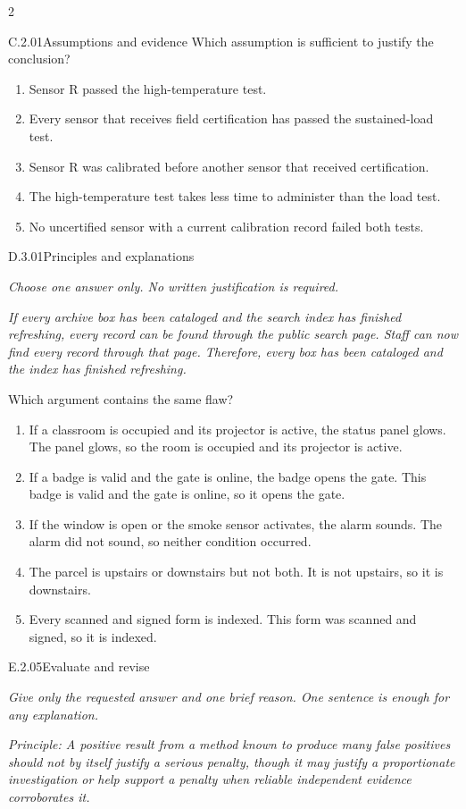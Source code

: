 \documentclass[9pt]{extarticle}
\newcommand{\choice}[1]{\item #1}
\begin{document}
\begin{multicols}{2}
\begin{DenseCoreProblem}{C.2.01}{Assumptions and evidence}
Which assumption is sufficient to justify the conclusion?
\begin{enumerate}[label=(\alph*)]
  \choice{Sensor R passed the high-temperature test.}
  \choice{Every sensor that receives field certification has passed the sustained-load test.}
  \choice{Sensor R was calibrated before another sensor that received certification.}
  \choice{The high-temperature test takes less time to administer than the load test.}
  \choice{No uncertified sensor with a current calibration record failed both tests.}
\end{enumerate}
\end{DenseCoreProblem}
\begin{DenseCoreProblem}{D.3.01}{Principles and explanations}
{\scriptsize\textit{Choose one answer only. No written justification is required.}\par}
\emph{If every archive box has been cataloged and the search index has finished refreshing, every record can be found through the public search page. Staff can now find every record through that page. Therefore, every box has been cataloged and the index has finished refreshing.}

Which argument contains the same flaw?
\begin{enumerate}[label=(\alph*)]
  \choice{If a classroom is occupied and its projector is active, the status panel glows. The panel glows, so the room is occupied and its projector is active.}
  \choice{If a badge is valid and the gate is online, the badge opens the gate. This badge is valid and the gate is online, so it opens the gate.}
  \choice{If the window is open or the smoke sensor activates, the alarm sounds. The alarm did not sound, so neither condition occurred.}
  \choice{The parcel is upstairs or downstairs but not both. It is not upstairs, so it is downstairs.}
  \choice{Every scanned and signed form is indexed. This form was scanned and signed, so it is indexed.}
\end{enumerate}
\end{DenseCoreProblem}
\begin{DenseCoreProblem}{E.2.05}{Evaluate and revise}
{\scriptsize\textit{Give only the requested answer and one brief reason. One sentence is enough for any explanation.}\par}
\emph{Principle: A positive result from a method known to produce many false positives should not by itself justify a serious penalty, though it may justify a proportionate investigation or help support a penalty when reliable independent evidence corroborates it.}


\end{DenseCoreProblem}
\end{multicols}
\end{document}
